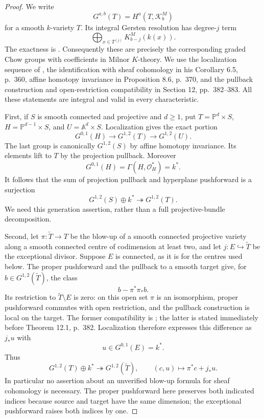 \begin{proof}
We write
\[
 G^{a,b}(T)=H^a(T,\mathcal K^M_b)
\]
for a smooth $k$-variety $T$. Its integral Gersten resolution has
degree-$j$ term
\[
 \bigoplus_{x\in T^{(j)}}K^M_{b-j}(k(x)).
\]
The exactness is \citet[Theorem 7.1, author pp.~21--22]{cyKerz2009Milnor}.
Consequently these are precisely the corresponding graded Chow groups
with coefficients in Milnor $K$-theory. We use the localization
sequence of \citet[Section 5, p.~356]{cyRost1996}, the identification
with sheaf cohomology in his Corollary 6.5, p.~360, affine homotopy
invariance in Proposition 8.6, p.~370, and the pullback construction
and open-restriction compatibility in Section 12, pp.~382--383.
All these statements are integral and valid in every characteristic.

First, if $S$ is smooth connected and projective and $d\geq1$, put
$T=\mathbb P^d\times S$, $H=\mathbb P^{d-1}\times S$, and
$U=\mathbb A^d\times S$. Localization gives the exact portion
\[
 G^{0,1}(H)\longrightarrow G^{1,2}(T)
 \longrightarrow G^{1,2}(U).
\]
The last group is canonically $G^{1,2}(S)$ by affine homotopy
invariance. Its elements lift to $T$ by the projection pullback.
Moreover
\[
 G^{0,1}(H)=\Gamma(H,\mathcal O_H^*)=k^*.
\]
It follows that the sum of projection pullback and hyperplane
pushforward is a surjection
\[
 G^{1,2}(S)\oplus k^*\twoheadrightarrow G^{1,2}(T).
 \tag{K2.1}
\]
We need this generation assertion, rather than a full projective-bundle
decomposition.

Second, let $\pi:\widetilde T\to T$ be the blow-up of a smooth
connected projective variety along a smooth connected centre of
codimension at least two, and let $j:E\hookrightarrow\widetilde T$
be the exceptional divisor. Suppose $E$ is connected, as it is for
the centres used below. The proper pushforward and the pullback to a
smooth target give, for $b\in G^{1,2}(\widetilde T)$, the class
\[
 b-\pi^*\pi_*b.
\]
Its restriction to $\widetilde T\setminus E$ is zero: on this open
set $\pi$ is an isomorphism, proper pushforward commutes with open
restriction, and the pullback construction is local on the target.
The former compatibility is \citet[Proposition 4.1(3), p.~351]{cyRost1996};
the latter is stated immediately before Theorem 12.1, p.~382.
Localization therefore expresses this difference as $j_*u$ with
\[
 u\in G^{0,1}(E)=k^*.
\]
Thus
\[
 G^{1,2}(T)\oplus k^*\twoheadrightarrow
 G^{1,2}(\widetilde T),\qquad (c,u)\longmapsto\pi^*c+j_*u.
 \tag{K2.2}
\]
In particular no assertion about an unverified blow-up formula for
sheaf cohomology is necessary. The proper pushforward here preserves
both indicated indices because source and target have the same
dimension; the exceptional pushforward raises both indices by one.


\end{proof}
